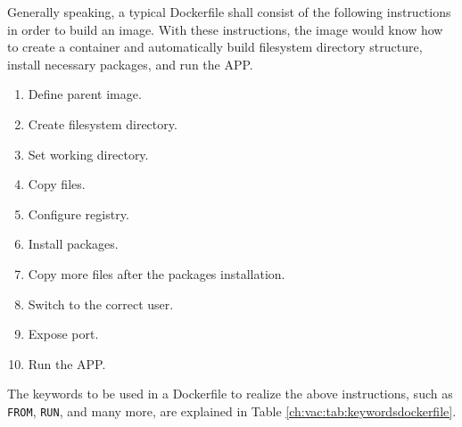 Generally speaking, a typical Dockerfile shall consist of the following instructions in order to build an image. With these instructions, the image would know how to create a container and automatically build filesystem directory structure, install necessary packages, and run the APP.
\begin{enumerate}[(1)]
  \item Define parent image.
  \item Create filesystem directory.
  \item Set working directory.
  \item Copy files.
  \item Configure registry.
  \item Install packages.
  \item Copy more files after the packages installation.
  \item Switch to the correct user.
  \item Expose port.
  \item Run the APP.
\end{enumerate}

The keywords to be used in a Dockerfile to realize the above instructions, such as \verb|FROM|, \verb|RUN|, and many more, are explained in Table \ref{ch:vac:tab:keywordsdockerfile}.

